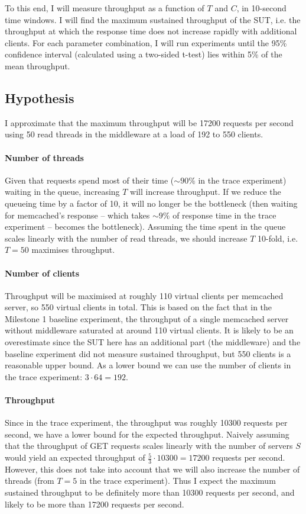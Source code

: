 \documentclass[11pt]{article}
\begin{document}
To this end, I will measure throughput as a function of $T$ and $C$, in 10-second time windows. I will find the maximum sustained throughput of the SUT, i.e. the throughput at which the response time does not increase rapidly with additional clients. For each parameter combination, I will run experiments until the 95\% confidence interval (calculated using a two-sided t-test) lies within 5\% of the mean throughput.

\subsection{Hypothesis}

I approximate that the maximum throughput will be 17200 requests per second using 50 read threads in the middleware at a load of 192 to 550 clients.

\paragraph{Number of threads} 
Given that requests spend most of their time ($\sim90\%$ in the trace experiment) waiting in the queue, increasing $T$ will increase throughput. If we reduce the queueing time by a factor of 10, it will no longer be the bottleneck (then waiting for memcached's response -- which takes $\sim9\%$ of response time in the trace experiment -- becomes the bottleneck). Assuming the time spent in the queue scales linearly with the number of read threads, we should increase $T$ 10-fold, i.e. $T=50$ maximises throughput.

\paragraph{Number of clients}
Throughput will be maximised at roughly 110 virtual clients per memcached server, so 550 virtual clients in total. This is based on the fact that in the Milestone 1 baseline experiment, the throughput of a single memcached server without middleware saturated at around 110 virtual clients. It is likely to be an overestimate since the SUT here has an additional part (the middleware) and the baseline experiment did not measure sustained throughput, but 550 clients is a reasonable upper bound. As a lower bound we can use the number of clients in the trace experiment: $3 \cdot 64=192$.

\paragraph{Throughput}
Since in the trace experiment, the throughput was roughly 10300 requests per second, we have a lower bound for the expected throughput. Naively assuming that the throughput of GET requests scales linearly with the number of servers $S$ would yield an expected throughput of $\frac{5}{3} \cdot 10300 = 17200$ requests per second. However, this does not take into account that we will also increase the number of threads (from $T=5$ in the trace experiment). Thus I expect the maximum sustained throughput to be definitely more than 10300 requests per second, and likely to be more than 17200 requests per second.
\end{document}

